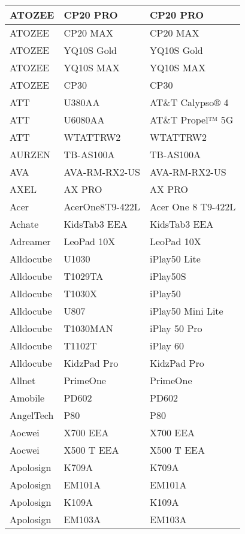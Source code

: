 \begin{tabularx}{\linewidth}{|l|X|X|}
        ATOZEE & CP20 PRO & CP20 PRO \\ \hline
        ATOZEE & CP20 MAX & CP20 MAX \\ \hline
        ATOZEE & YQ10S Gold & YQ10S Gold \\ \hline
        ATOZEE & YQ10S MAX & YQ10S MAX \\ \hline
        ATOZEE & CP30 & CP30 \\ \hline
        ATT & U380AA & AT\&T Calypso® 4 \\ \hline
        ATT & U6080AA & AT\&T Propel™ 5G \\ \hline
        ATT & WTATTRW2 & WTATTRW2 \\ \hline
        AURZEN & TB-AS100A & TB-AS100A \\ \hline
        AVA & AVA-RM-RX2-US & AVA-RM-RX2-US \\ \hline
        AXEL & AX PRO & AX PRO \\ \hline
        Acer & AcerOne8T9-422L & Acer One 8 T9-422L \\ \hline
        Achate & KidsTab3 EEA & KidsTab3 EEA \\ \hline
        Adreamer & LeoPad 10X & LeoPad 10X \\ \hline
        Alldocube & U1030 & iPlay50 Lite \\ \hline
        Alldocube & T1029TA & iPlay50S \\ \hline
        Alldocube & T1030X & iPlay50 \\ \hline
        Alldocube & U807 & iPlay50 Mini Lite \\ \hline
        Alldocube & T1030MAN & iPlay 50 Pro \\ \hline
        Alldocube & T1102T & iPlay 60 \\ \hline
        Alldocube & KidzPad Pro & KidzPad Pro \\ \hline
        Allnet & PrimeOne & PrimeOne \\ \hline
        Amobile & PD602 & PD602 \\ \hline
        AngelTech & P80 & P80 \\ \hline
        Aocwei & X700 EEA & X700 EEA \\ \hline
        Aocwei & X500 T EEA & X500 T EEA \\ \hline
        Apolosign & K709A & K709A \\ \hline
        Apolosign & EM101A & EM101A \\ \hline
        Apolosign & K109A & K109A \\ \hline
        Apolosign & EM103A & EM103A \\ \hline

\end{tabularx}
